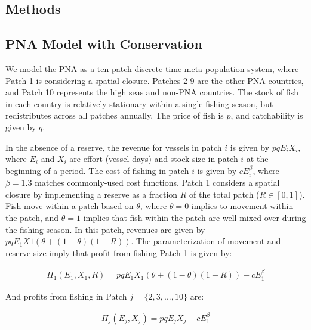 \documentclass[9p,twocolumn,twoside,lineno]{pnas-new}
\begin{document}
\begin{scriptsize}

\section{Methods}

\subsection{PNA Model with Conservation}

We model the PNA as a ten-patch discrete-time meta-population system, where Patch 1 is considering a spatial closure. Patches 2-9 are the other PNA countries, and Patch 10 represents the high seas and non-PNA countries. The stock of fish in each country is relatively stationary within a single fishing season, but redistributes across all patches annually. The price of fish is $p$, and catchability is given by $q$.

In the absence of a reserve, the revenue for vessels in patch $i$ is given by $pqE_iX_i$, where $E_i$ and $X_i$ are effort (vessel-days) and stock size in patch $i$ at the beginning of a period. The cost of fishing in patch $i$ is given by $cE_i^\beta$, where $\beta = 1.3$ matches commonly-used cost functions. Patch 1 considers a spatial closure by implementing a reserve as a fraction $R$ of the total patch ($R \in[0,1]$). Fish move within a patch based on $\theta$, where $\theta = 0$ implies to movement within the patch, and $\theta = 1$ implies that fish within the patch are well mixed over during the fishing season. In this patch, revenues are given by $pqE_1X1(\theta + (1 - \theta)(1 - R))$. The parameterization of movement and reserve size imply that profit from fishing Patch 1 is given by:

\begin{figure}[H]	
	\begin{align}
	\Pi_1(E_1,X_1,R) = pqE_1X_1(\theta + (1 - \theta)(1 - R))-cE_1^\beta
	\end{align}
\end{figure}

And profits from fishing in Patch $j = \{2, 3, ..., 10\}$ are:

\begin{figure}[H]	
	\begin{align}
	\Pi_j(E_j,X_j) = pqE_jX_j-cE_1^\beta
	\end{align}
\end{figure}


\end{scriptsize}
\end{document}
